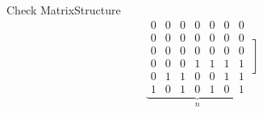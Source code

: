\begin{frame}{Check Matrix}{Structure}
{\[            \underbrace{
                \begin{matrix}
                    0 & 0 & 0 & 0 & 0 & 0 & 0 \\
                    0 & 0 & 0 & 0 & 0 & 0 & 0 \\
                    0 & 0 & 0 & 0 & 0 & 0 & 0 \\
                    0 & 0 & 0 & 1 & 1 & 1 & 1 \\
                    0 & 1 & 1 & 0 & 0 & 1 & 1 \\
                    1 & 0 & 1 & 0 & 1 & 0 & 1
                \end{matrix}
            }_{n}
            \left]\begin{matrix}
                      \, \\ \, \\ \, \\ \, \\ \, \\ \,
            \end{matrix}\right.
        \]
    }

    \vspace*{2mm}

\end{frame}


